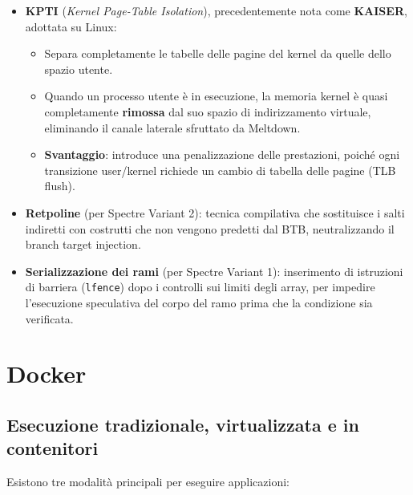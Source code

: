\documentclass{article}
\begin{document}
\begin{itemize}
    \item \textbf{KPTI} (\textit{Kernel Page-Table Isolation}), 
    precedentemente nota come \textbf{KAISER}, adottata su Linux:
    \begin{itemize}
        \item Separa completamente le tabelle delle pagine del kernel 
        da quelle dello spazio utente.
        \item Quando un processo utente è in esecuzione, la memoria 
        kernel è quasi completamente \textbf{rimossa} dal suo spazio 
        di indirizzamento virtuale, eliminando il canale laterale 
        sfruttato da Meltdown.
        \item \textbf{Svantaggio}: introduce una penalizzazione delle 
        prestazioni, poiché ogni transizione user/kernel richiede 
        un cambio di tabella delle pagine (TLB flush).
    \end{itemize}

    \item \textbf{Retpoline} (per Spectre Variant 2): tecnica 
    compilativa che sostituisce i salti indiretti con costrutti 
    che non vengono predetti dal BTB, neutralizzando il 
    branch target injection.

    \item \textbf{Serializzazione dei rami} (per Spectre Variant 1): 
    inserimento di istruzioni di barriera (\texttt{lfence}) dopo i 
    controlli sui limiti degli array, per impedire l'esecuzione 
    speculativa del corpo del ramo prima che la condizione sia 
    verificata.
\end{itemize}


\section{Docker}

\subsection*{Esecuzione tradizionale, virtualizzata e in contenitori}

Esistono tre modalità principali per eseguire applicazioni:
\end{document}
